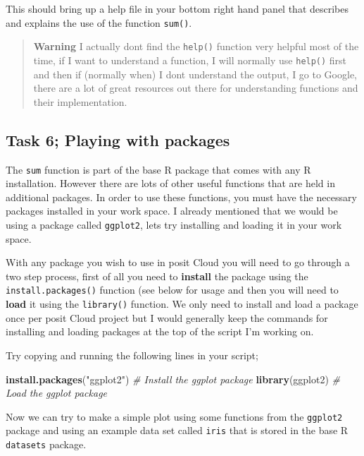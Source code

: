 \documentclass[
]{book}
\newenvironment{Shaded}{\begin{snugshade}}{\end{snugshade}}
\newcommand{\CommentTok}[1]{\textcolor[rgb]{0.56,0.35,0.01}{\textit{#1}}}
\newcommand{\FunctionTok}[1]{\textcolor[rgb]{0.13,0.29,0.53}{\textbf{#1}}}
\newcommand{\NormalTok}[1]{#1}
\newcommand{\StringTok}[1]{\textcolor[rgb]{0.31,0.60,0.02}{#1}}
\begin{document}
This should bring up a help file in your bottom right hand panel that describes and explains the use of the function \texttt{sum()}.

\begin{quote}
\textbf{Warning} I actually dont find the \texttt{help()} function very helpful most of the time, if I want to understand a function, I will normally use \texttt{help()} first and then if (normally when) I dont understand the output, I go to Google, there are a lot of great resources out there for understanding functions and their implementation.
\end{quote}

\subsection{Task 6; Playing with packages}\label{installing-packages}

The \texttt{sum} function is part of the base R package that comes with any R installation. However there are lots of other useful functions that are held in additional packages. In order to use these functions, you must have the necessary packages installed in your work space. I already mentioned that we would be using a package called \texttt{ggplot2}, lets try installing and loading it in your work space.

With any package you wish to use in posit Cloud you will need to go through a two step process, first of all you need to \textbf{install} the package using the \texttt{install.packages()} function (see below for usage and then you will need to \textbf{load} it using the \texttt{library()} function. We only need to install and load a package once per posit Cloud project but I would generally keep the commands for installing and loading packages at the top of the script I'm working on.

Try copying and running the following lines in your script;

\begin{Shaded}
\begin{Highlighting}[]
\FunctionTok{install.packages}\NormalTok{(}\StringTok{"ggplot2"}\NormalTok{) }\CommentTok{\# Install the ggplot package}
\FunctionTok{library}\NormalTok{(ggplot2) }\CommentTok{\# Load the ggplot package}
\end{Highlighting}
\end{Shaded}

Now we can try to make a simple plot using some functions from the \texttt{ggplot2} package and using an example data set called \texttt{iris} that is stored in the base R \texttt{datasets} package.
\end{document}
